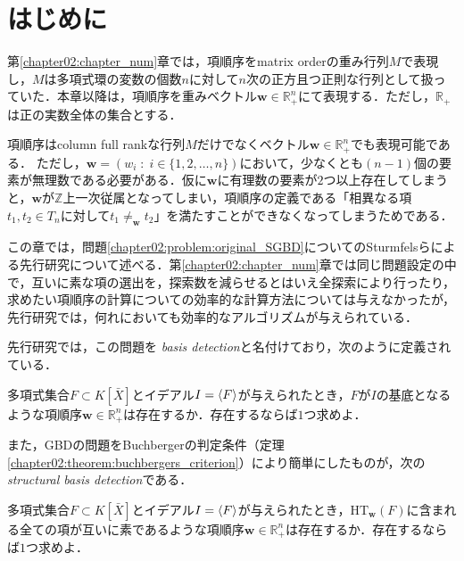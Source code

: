 \section{はじめに}
第\ref{chapter02:chapter_num}章では，項順序をmatrix orderの重み行列$M$で表現し，$M$は多項式環の変数の個数$n$に対して$n$次の正方且つ正則な行列として扱っていた．本章以降は，項順序を重みベクトル$\bm{w}\in \mathbb{R}^n_{+}$にて表現する．ただし，$\mathbb{R}_{+}$は正の実数全体の集合とする．
\begin{remark*}[ベクトルで表現された項順序について]
	項順序はcolumn full rankな行列$M$だけでなくベクトル$\bm{w}\in \mathbb{R}^n_{+}$でも表現可能である．
	ただし，$\bm{w} = (w_i\;:\; i\in \{1, 2, \dots, n\})$において，少なくとも$(n-1)$個の要素が無理数である必要がある．仮に$\bm{w}$に有理数の要素が$2$つ以上存在してしまうと，$\bm{w}$が$\mathbb{Z}$上一次従属となってしまい，項順序の定義である「相異なる項$t_1, t_2 \in T_n$に対して$t_1 \ne_{\bm{w}} t_2$」を満たすことができなくなってしまうためである．
\end{remark*}
\par
この章では，問題\ref{chapter02:problem:original_SGBD}についてのSturmfelsらによる先行研究について述べる．第\ref{chapter02:chapter_num}章では同じ問題設定の中で，互いに素な項の選出を，探索数を減らせるとはいえ全探索により行ったり，求めたい項順序の計算についての効率的な計算方法については与えなかったが，先行研究では，何れにおいても効率的なアルゴリズムが与えられている．
\par
先行研究では，この問題を\emph{\groebner{} basis detection}と名付けており，次のように定義されている．
\begin{problem}
	多項式集合$F \subset K[\bar{X}]$とイデアル$I = \langle F \rangle$が与えられたとき，$F$が$I$の\groebner{}基底となるような項順序$\bm{w} \in \mathbb{R}^n_{+}$は存在するか．存在するならば$1$つ求めよ．
\end{problem}
また，GBDの問題をBuchbergerの判定条件（定理\ref{chapter02:theorem:buchbergers_criterion}）により簡単にしたものが，次の\emph{structural \groebner{} basis detection}である．
\begin{problem}
	\label{chapter03:problem:SGBD}
	多項式集合$F \subset K[\bar{X}]$とイデアル$I = \langle F \rangle$が与えられたとき，$\mathrm{HT}_{\bm{w}}(F)$に含まれる全ての項が互いに素であるような項順序$\bm{w} \in \mathbb{R}^n_{+}$は存在するか．存在するならば$1$つ求めよ．
\end{problem}











